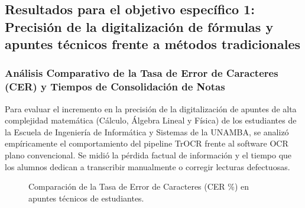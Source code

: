 
\subsection{Resultados para el objetivo específico 1: Precisión de la digitalización de fórmulas y apuntes técnicos frente a métodos tradicionales}

\subsubsection{Análisis Comparativo de la Tasa de Error de Caracteres (CER) y Tiempos de Consolidación de Notas}

Para evaluar el incremento en la precisión de la digitalización de apuntes de alta complejidad matemática (Cálculo, Álgebra Lineal y Física) de los estudiantes de la Escuela de Ingeniería de Informática y Sistemas de la UNAMBA, se analizó empíricamente el comportamiento del pipeline TrOCR frente al software OCR plano convencional. Se midió la pérdida factual de información y el tiempo que los alumnos dedican a transcribir manualmente o corregir lecturas defectuosas.

\vspace{0.4cm}

\begin{figure}[H]
\centering
{}
\caption{Comparación de la Tasa de Error de Caracteres (CER \%) en apuntes técnicos de estudiantes.}
\label{fig:homogenizacion_registros}
\end{figure}

